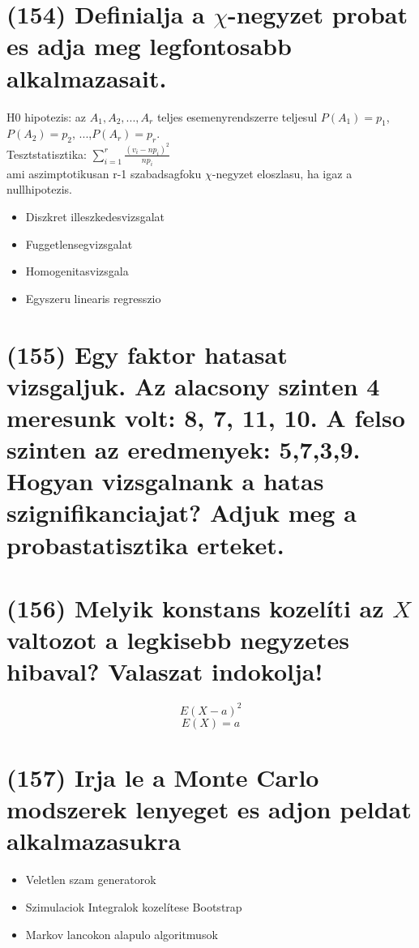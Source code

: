\documentclass[12p]{article}
\begin{document}
\section{(154) Definialja a $\chi$-negyzet probat es adja meg legfontosabb alkalmazasait.}

H0 hipotezis: az $A_1, A_2, ..., A_r$ teljes esemenyrendszerre teljesul $P(A_1)=p_1$, $P(A_2)=p_2$, ...,$P(A_r)=p_r$.\\
Tesztstatisztika: $\displaystyle{ \sum^r_{i=1} \frac{(v_i - np_i)^2}{np_i}}$\\
ami aszimptotikusan r-1 szabadsagfoku $\chi$-negyzet eloszlasu, ha igaz a nullhipotezis. 

\begin{itemize}
	\item Diszkret illeszkedesvizsgalat
	\item Fuggetlensegvizsgalat
	\item Homogenitasvizsgala
	\item Egyszeru linearis regresszio
\end{itemize}

\section{(155) Egy faktor hatasat vizsgaljuk. Az alacsony szinten 4 meresunk volt: 8, 7, 11, 10. A felso
szinten az eredmenyek: 5,7,3,9. Hogyan vizsgalnank a hatas szignifikanciajat? Adjuk meg
a probastatisztika erteket.}

\section{(156) Melyik konstans kozelíti az $X$ valtozot a legkisebb negyzetes hibaval? Valaszat indokolja!}

$$E(X-a)^2$$
$$E(X)=a$$

\section{(157)  Irja le a Monte Carlo modszerek lenyeget es adjon peldat alkalmazasukra}

\begin{itemize}
	\item Veletlen szam generatorok
	\item Szimulaciok
	\subitem Integralok kozelítese
	\subitem Bootstrap
	\item Markov lancokon alapulo algoritmusok
\end{itemize}
\end{document}
